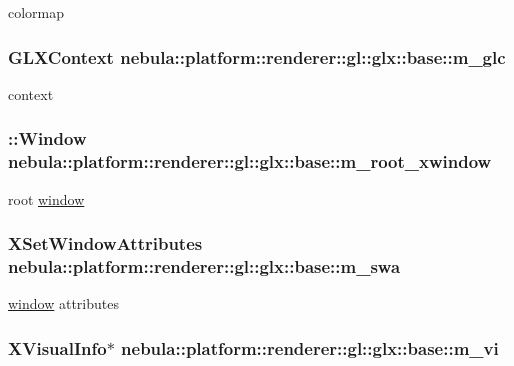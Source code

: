 colormap \hypertarget{classnebula_1_1platform_1_1renderer_1_1gl_1_1glx_1_1base_a77dba9715eb9d07d7516412450d95959}{
\subsubsection[{m\_\-glc}]{\setlength{\rightskip}{0pt plus 5cm}GLXContext {\bf nebula::platform::renderer::gl::glx::base::m\_\-glc}}}
\label{classnebula_1_1platform_1_1renderer_1_1gl_1_1glx_1_1base_a77dba9715eb9d07d7516412450d95959}


context \hypertarget{classnebula_1_1platform_1_1renderer_1_1gl_1_1glx_1_1base_aeeeefc0c87375715e1c863cdbbc85888}{
\subsubsection[{m\_\-root\_\-xwindow}]{\setlength{\rightskip}{0pt plus 5cm}::Window {\bf nebula::platform::renderer::gl::glx::base::m\_\-root\_\-xwindow}}}
\label{classnebula_1_1platform_1_1renderer_1_1gl_1_1glx_1_1base_aeeeefc0c87375715e1c863cdbbc85888}


root \hyperlink{namespacenebula_1_1platform_1_1window}{window} \hypertarget{classnebula_1_1platform_1_1renderer_1_1gl_1_1glx_1_1base_a8346b7b80d3d397e563d4b93a44be523}{
\subsubsection[{m\_\-swa}]{\setlength{\rightskip}{0pt plus 5cm}XSetWindowAttributes {\bf nebula::platform::renderer::gl::glx::base::m\_\-swa}}}
\label{classnebula_1_1platform_1_1renderer_1_1gl_1_1glx_1_1base_a8346b7b80d3d397e563d4b93a44be523}


\hyperlink{namespacenebula_1_1platform_1_1window}{window} attributes \hypertarget{classnebula_1_1platform_1_1renderer_1_1gl_1_1glx_1_1base_a2df56a32e4bd22c74ac1bef7d23d80aa}{
\subsubsection[{m\_\-vi}]{\setlength{\rightskip}{0pt plus 5cm}XVisualInfo$\ast$ {\bf nebula::platform::renderer::gl::glx::base::m\_\-vi}}}
\label{classnebula_1_1platform_1_1renderer_1_1gl_1_1glx_1_1base_a2df56a32e4bd22c74ac1bef7d23d80aa}


